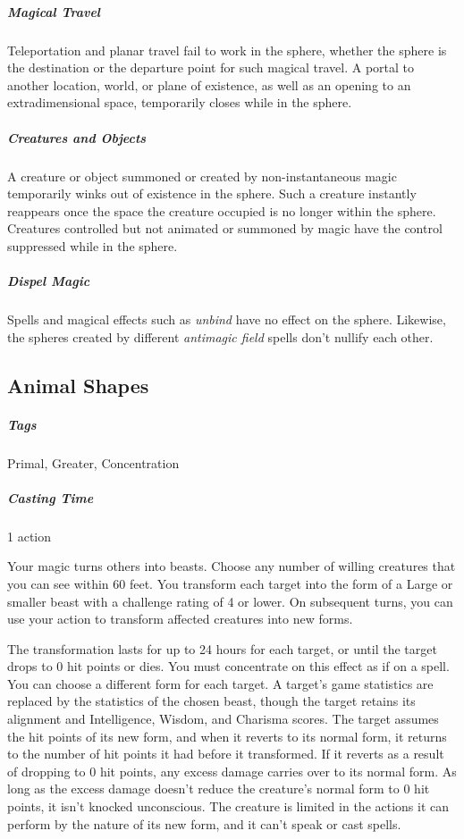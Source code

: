 \subparagraph*{Magical Travel} Teleportation and planar travel fail to work in the sphere, whether the sphere is the destination or the departure point for such magical travel. A portal to another location, world, or plane of existence, as well as an opening to an extradimensional space, temporarily closes while in the sphere.

\subparagraph*{Creatures and Objects} A creature or object summoned or created by non-instantaneous magic temporarily winks out of existence in the sphere. Such a creature instantly reappears once the space the creature occupied is no longer within the sphere. Creatures controlled but not animated or summoned by magic have the control suppressed while in the sphere.

\subparagraph*{Dispel Magic} Spells and magical effects such as \textit{unbind} have no effect on the sphere. Likewise, the spheres created by different \textit{antimagic field} spells don't nullify each other.

\subsection{Animal Shapes}
\label{spell:animal-shapes}
\subparagraph*{Tags} Primal, Greater, Concentration
\subparagraph*{Casting Time} 1 action

Your magic turns others into beasts. Choose any number of willing creatures that you can see within 60 feet. You transform each target into the form of a Large or smaller beast with a challenge rating of 4 or lower. On subsequent turns, you can use your action to transform affected creatures into new forms.

The transformation lasts for up to 24 hours for each target, or until the target drops to 0 hit points or dies. You must concentrate on this effect as if on a spell. You can choose a different form for each target. A target's game statistics are replaced by the statistics of the chosen beast, though the target retains its alignment and Intelligence, Wisdom, and Charisma scores. The target assumes the hit points of its new form, and when it reverts to its normal form, it returns to the number of hit points it had before it transformed. If it reverts as a result of dropping to 0 hit points, any excess damage carries over to its normal form. As long as the excess damage doesn't reduce the creature's normal form to 0 hit points, it isn't knocked unconscious. The creature is limited in the actions it can perform by the nature of its new form, and it can't speak or cast spells.

